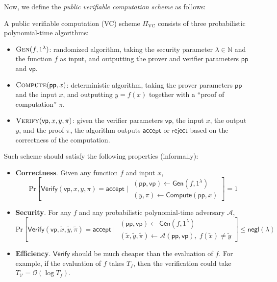 \documentclass{iacrtrans}
\begin{document}
Now, we define the \textit{public verifiable computation scheme} as follows:
\begin{definition}
  A public verifiable computation (VC) scheme $\Pi_{\text{VC}}$
  consists of three probabilistic polynomial-time algorithms:
  \begin{itemize}
    \item $\textsc{Gen}(f,1^{\lambda})$: randomized algorithm, taking the
      security parameter $\lambda \in \mathbb{N}$ and the function $f$ as input,
      and outputting the prover and verifier parameters $\mathsf{pp}$ and
      $\mathsf{vp}$.
    \item $\textsc{Compute}(\mathsf{pp}, x)$: deterministic algorithm, taking
      the prover parameters $\mathsf{pp}$ and the input $x$, and
      outputting $y=f(x)$
      together with a ``proof of computation'' $\pi$.
    \item $\textsc{Verify}(\mathsf{vp}, x, y, \pi)$: given the verifier
      parameters $\mathsf{vp}$, the input $x$, the output $y$, and the proof
      $\pi$, the algorithm outputs $\mathsf{accept}$ or
      $\mathsf{reject}$ based on
      the correctness of the computation.
  \end{itemize}

  Such scheme should satisfy the following properties (informally):
  \begin{itemize}
    \item \textbf{Correctness}. Given any function $f$ and input $x$,
      \begin{equation*}
        \text{Pr}\left[\mathsf{Verify}(\mathsf{vp}, x, y, \pi) =
          \mathsf{accept}\; \Big| \;
          \begin{matrix}
            (\mathsf{pp},\mathsf{vp}) \gets \mathsf{Gen}(f,1^{\lambda}) \\
            (y,\pi) \gets \mathsf{Compute}(\mathsf{pp},x)
        \end{matrix}\right] = 1
      \end{equation*}
    \item \textbf{Security}. For any $f$ and any probabilistic
      polynomial-time adversary $\mathcal{A}$,
      \begin{equation*}
        \text{Pr}\left[\mathsf{Verify}(\mathsf{vp}, \widetilde{x},
          \widetilde{y}, \widetilde{\pi}) = \mathsf{accept}\; \Big| \;
          \begin{matrix}
            (\mathsf{pp},\mathsf{vp}) \gets \mathsf{Gen}(f,1^{\lambda}) \\
            (\widetilde{x}, \widetilde{y}, \widetilde{\pi}) \gets
            \mathcal{A}(\mathsf{pp}, \mathsf{vp}), \;
            f(\widetilde{x}) \neq \widetilde{y}
        \end{matrix}\right] \leq \mathsf{negl}(\lambda)
      \end{equation*}
    \item \textbf{Efficiency}. $\mathsf{Verify}$ should be much cheaper than the
      evaluation of $f$. For example, if the evaluation of $f$ takes $T_f$,
      then the verification could take $T_{\mathcal{V}} =
      \mathcal{O}(\log T_f)$.
  \end{itemize}
\end{definition}
\end{document}
